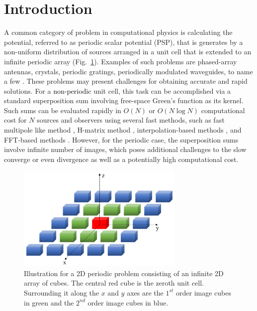 \documentclass{article}
\begin{document}
\section{Introduction} \label{sec:1}

A common category of problem in computational physics is calculating the potential, referred to as periodic scalar potential (PSP), that is generates by a non-uniform distribution of sources arranged in a unit cell that is extended to an infinite periodic array (Fig.~\ref{fig:illu_prob}). Examples of such problems are phased-array antennas, crystals, periodic gratings, periodically modulated waveguides, to name a few \cite{mailloux2017phased, kalkstein1971green, sirenko2010modern, peng1975theory}. These problems may present challenges for obtaining accurate and rapid solutions. For a \textcolor{black}{non-periodic} unit cell, this task can be accomplished via a standard superposition sum involving free-space Green's function as its kernel. Such sums can be evaluated rapidly in $O(N)$ or $O(N\log N)$ computational cost for $N$ sources and observers using several fast methods, such as fast multipole like method \cite{GREENGARD1987325, 6230628}, H-matrix method \cite{hackbusch2000sparse}, interpolation-based methods \cite{1159856, LI20108463, MENG20108430}, and FFT-based methods \cite{NUFFT, ali_yilmaz, 7770011, 662670}. However, for the periodic case, the superposition sums involve infinite number of images, which poses additional challenges to the slow converge or even divergence as well as a potentially high computational cost. 

\begin{figure}[h] 
\includegraphics[width=8cm]{illu_prob.png}
\centering
\caption{Illustration for a 2D periodic problem consisting of an infinite 2D array of cubes. The central red cube is the zeroth unit cell. Surrounding it along the $x$ and $y$ axes are the $1^{st}$ order image cubes in green and the $2^{nd}$ order image cubes in blue.} \label{fig:illu_prob}
\end{figure}
\end{document}
